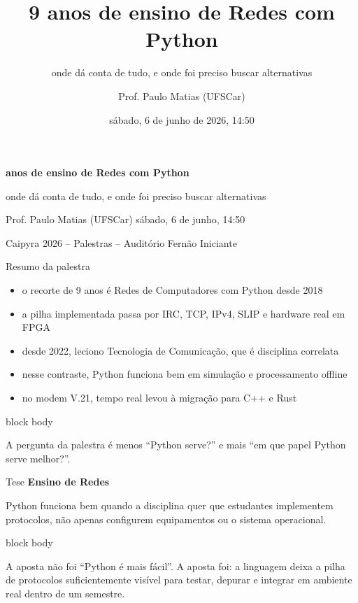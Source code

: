 \documentclass[aspectratio=169,11pt]{beamer}
\title{9 anos de ensino de Redes com Python}
\subtitle{onde dá conta de tudo, e onde foi preciso buscar alternativas}
\author{Prof. Paulo Matias (UFSCar)}
\date{sábado, 6 de junho de 2026, 14:50}
\newcommand{\eyebrow}[1]{{\color{caipyraOrange}\small\bfseries #1}\par\vspace{0.25em}}
\newcommand{\callout}[1]{%
  \begin{beamercolorbox}[wd=\linewidth,sep=0.7em,rounded=true]{block body}
    #1
  \end{beamercolorbox}
}
\newenvironment{tightitemize}{%
  \begin{itemize}\setlength{\itemsep}{0.25em}\setlength{\parskip}{0pt}
}{\end{itemize}}
\begin{document}
{
\begin{frame}[plain]
  \vspace{1.2cm}
  {\color{white}\bfseries\fontsize{30}{34} anos de ensino de Redes com Python}\par
  \vspace{0.4cm}
  {\color{caipyraYellow}\Large onde dá conta de tudo, e onde foi preciso buscar alternativas}\par
  \vfill
  {\color{white}Prof. Paulo Matias (UFSCar) \hfill sábado, 6 de junho, 14:50}\par
  \vspace{0.25em}
  {\color{white}Caipyra 2026 -- Palestras -- Auditório Fernão \hfill Iniciante}
\end{frame}
}

\begin{frame}{Resumo da palestra}
  \begin{tightitemize}
    \item o recorte de 9 anos é Redes de Computadores com Python desde 2018
    \item a pilha implementada passa por IRC, TCP, IPv4, SLIP e hardware real em FPGA
    \item desde 2022, leciono Tecnologia de Comunicação, que é disciplina correlata
    \item nesse contraste, Python funciona bem em simulação e processamento offline
    \item no modem V.21, tempo real levou à migração para C++ e Rust
  \end{tightitemize}

  \vspace{0.8em}
  \callout{
    A pergunta da palestra é menos ``Python serve?'' e mais ``em que papel
    Python serve melhor?''.
  }
\end{frame}

\begin{frame}{Tese}
  \eyebrow{Ensino de Redes}
  \Large
  Python funciona bem quando a disciplina quer que estudantes implementem protocolos,
  não apenas configurem equipamentos ou o sistema operacional.

  \vspace{0.8em}
  \normalsize
  \callout{
    A aposta não foi ``Python é mais fácil''. A aposta foi: a linguagem deixa a
    pilha de protocolos suficientemente visível para testar, depurar e integrar
    em ambiente real dentro de um semestre.
  }
\end{frame}
\end{document}
